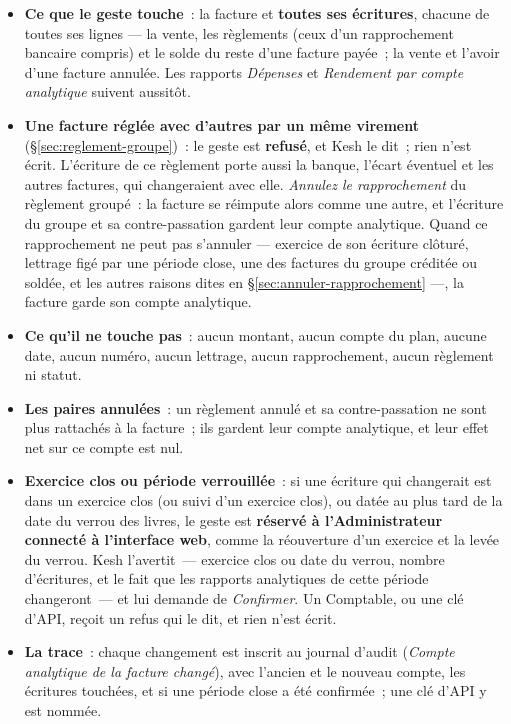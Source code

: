 \documentclass[a4paper,11pt,oneside]{article}
\begin{document}
\begin{itemize}
    \item \textbf{Ce que le geste touche}~: la facture et \textbf{toutes ses écritures}, chacune
          de toutes ses lignes --- la vente, les règlements (ceux d'un rapprochement bancaire
          compris) et le solde du reste d'une facture payée~; la vente et l'avoir d'une facture
          annulée. Les rapports \emph{Dépenses} et \emph{Rendement par compte analytique}
          suivent aussitôt.
    \item \textbf{Une facture réglée avec d'autres par un même virement}
          (\S\ref{sec:reglement-groupe})~: le geste est \textbf{refusé}, et Kesh le dit~; rien
          n'est écrit. L'écriture de ce règlement porte aussi la banque, l'écart éventuel et les
          autres factures, qui changeraient avec elle. \emph{Annulez le rapprochement} du
          règlement groupé~: la facture se réimpute alors comme une autre, et l'écriture du groupe
          et sa contre-passation gardent leur compte analytique. Quand ce rapprochement ne peut
          pas s'annuler --- exercice de son écriture clôturé, lettrage figé par une période close,
          une des factures du groupe créditée ou soldée, et les autres raisons dites en
          \S\ref{sec:annuler-rapprochement} ---, la facture garde son compte analytique.
    \item \textbf{Ce qu'il ne touche pas}~: aucun montant, aucun compte du plan, aucune date,
          aucun numéro, aucun lettrage, aucun rapprochement, aucun règlement ni statut.
    \item \textbf{Les paires annulées}~: un règlement annulé et sa contre-passation ne sont plus
          rattachés à la facture~; ils gardent leur compte analytique, et leur effet net sur ce
          compte est nul.
    \item \textbf{Exercice clos ou période verrouillée}~: si une écriture qui changerait est
          dans un exercice clos (ou suivi d'un exercice clos), ou datée au plus tard de la date
          du verrou des livres, le geste est \textbf{réservé à l'Administrateur connecté à
          l'interface web}, comme la réouverture d'un exercice et la levée du verrou. Kesh
          l'avertit~--- exercice clos ou date du verrou, nombre d'écritures, et le fait que les
          rapports analytiques de cette période changeront~--- et lui demande de
          \emph{Confirmer}. Un Comptable, ou une clé d'API, reçoit un refus qui le dit, et rien
          n'est écrit.
    \item \textbf{La trace}~: chaque changement est inscrit au journal d'audit (\emph{Compte
          analytique de la facture changé}), avec l'ancien et le nouveau compte, les écritures
          touchées, et si une période close a été confirmée~; une clé d'API y est nommée.
\end{itemize}
\end{document}
